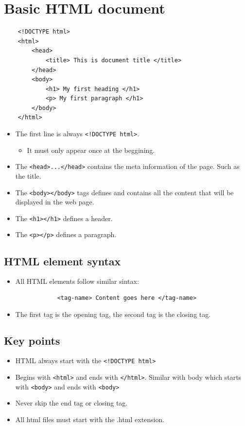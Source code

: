 \section{Basic HTML document}
\begin{verbatim}
    <!DOCTYPE html>
    <html>
        <head>
            <title> This is document title </title>
        </head>
        <body>
            <h1> My first heading </h1>
            <p> My first paragraph </h1>
        </body>
    </html>
\end{verbatim}
\begin{itemize}
    \item The first line is always \texttt{<!DOCTYPE html>}. 
        \begin{itemize}
            \item It must only appear once at the beggining.
        \end{itemize}
    
    \item The \texttt{<head>...</head>} contains the meta information of the page. Such as the title.
    \item The \texttt{<body></body>} tags defines and contains all the content that will be displayed in the web page.
    \item The \texttt{<h1></h1>} defines a header.
    \item The \texttt{<p></p>} defines a paragraph.
\end{itemize}

\subsection{HTML element syntax}
\begin{itemize}
    \item All HTML elements follow similar sintax:
        \begin{verbatim}
            <tag-name> Content goes here </tag-name>
        \end{verbatim}
    
    \item The first tag is the opening tag, the second tag is the closing tag.
\end{itemize}

\subsection{Key points}
\begin{itemize}
    \item HTML always start with the \texttt{<!DOCTYPE html>}
    \item Begins with \texttt{<html>} and ends with \texttt{</html>}. Similar with body which starts with \texttt{<body>} and ends with \texttt{<body>}
    \item Never skip the end tag or closing tag.
    \item All html files must start with the .html extension.
\end{itemize}

